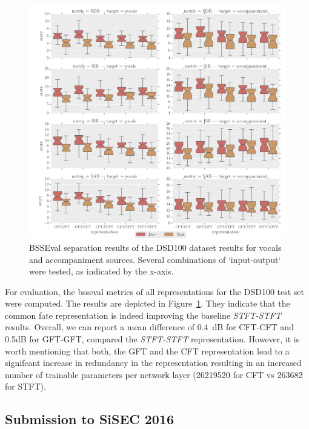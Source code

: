 {{\begin{figure}[t]
\centering
\includegraphics[width=1.0\textwidth]{Chapters/06_Separation_Unknown/figures/boxplot.pdf}
\caption{BSSEval separation results of the DSD100 dataset results for vocals and accompaniment sources. Several combinations of `input-output` were tested, as indicated by the x-axis.}
\label{fig:deep_cft_boxplots}
\end{figure}

For evaluation, the bsseval metrics of all representations for the DSD100 test set were computed.
The results are depicted in Figure~\ref{fig:deep_cft_boxplots}.
They indicate that the common fate representation is indeed improving the baseline \emph{STFT-STFT} results.
Overall, we can report a mean difference of 0.4~dB for CFT-CFT and 0.5dB for GFT-GFT, compared the \emph{STFT-STFT} representation.
However, it is worth mentioning that both, the GFT and the CFT representation lead to a signifcant increase in redundancy in the representation resulting in an increased number of trainable parameters per network layer (26219520 for CFT vs 263682 for STFT).

\subsection{Submission to SiSEC 2016}
\label{ssec:performance}


}}
